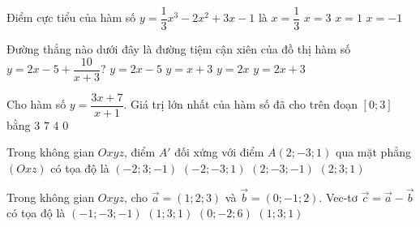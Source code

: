 \begin{ex}%
Điểm cực tiểu của hàm số $y=\dfrac{1}{3}x^3-2x^2+3x-1$ là
	\choice
	{$x=\dfrac{1}{3}$}
	{\True $x=3$}
	{$x=1$}
	{$x=-1$}
\end{ex}

\begin{ex}%
Đường thẳng nào dưới đây là đường tiệm cận xiên của đồ thị hàm số $y=2x-5+\dfrac{10}{x+3}$?
	\choice
	{\True $y=2x-5$}
	{$y=x+3$}
	{$y=2x$}
	{$y=2x+3$}
\end{ex}

\begin{ex}%
Cho hàm số $y=\dfrac{3x+7}{x+1}$. Giá trị lớn nhất của hàm số đã cho trên đoạn $[0;3]$ bằng
	\choice
	{$3$}
	{\True $7$}
	{$4$}
	{$0$}
\end{ex}

\begin{ex}%
Trong không gian $Oxyz$, điểm $A'$ đối xứng với điểm $A(2;-3;1)$ qua mặt phẳng $(Oxz)$ có tọa độ là
	\choice
	{$(-2;3;-1)$}
	{$(-2;-3;1)$}
	{$(2;-3;-1)$}
	{\True $(2;3;1)$}
\end{ex}

\begin{ex}%
Trong không gian $Oxyz$, cho $\overrightarrow{a}=(1;2;3)$ và $\overrightarrow{b}=(0;-1;2)$. Vec-tơ $\overrightarrow{c}=\overrightarrow{a}-\overrightarrow{b}$ có tọa độ là
	\choice
	{$(-1;-3;-1)$}
	{\True $(1;3;1)$}
	{$(0;-2;6)$}
	{$(1;3;1)$}
\end{ex}

